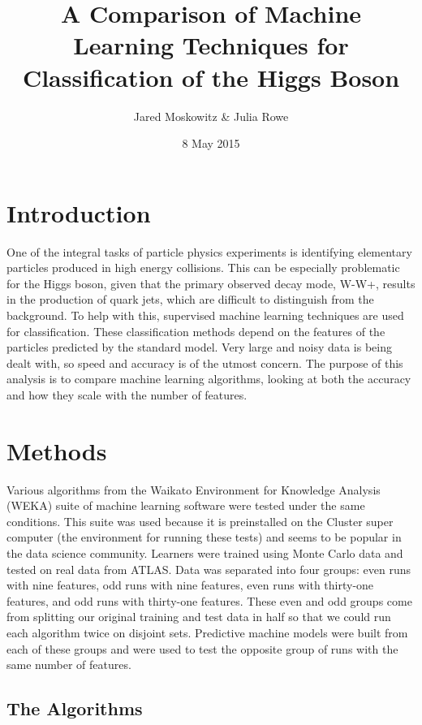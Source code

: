 \documentclass[aps, reprint, amsmath, amssymb]{revtex4-1}
\begin{document}
\title{A Comparison of Machine Learning Techniques for Classification of the Higgs Boson}
\author{Jared Moskowitz \& Julia Rowe}
\date{8 May 2015}

\maketitle

\section{Introduction}
One of the integral tasks of particle physics experiments is identifying elementary particles produced in high energy collisions. This can be especially problematic for the Higgs boson, given that the primary observed decay mode, W-W+, results in the production of quark jets, which are difficult to distinguish from the background. To help with this, supervised machine learning techniques are used for classification. These classification methods depend on the features of the particles predicted by the standard model.  Very large and noisy data is being dealt with, so speed and accuracy is of the utmost concern. The purpose of this analysis is to compare machine learning algorithms, looking at both the accuracy and how they scale with the number of features.  

\section{Methods}
Various algorithms from the Waikato Environment for Knowledge Analysis (WEKA) suite of machine learning software were tested under the same conditions. This suite was used because it is preinstalled on the Cluster super computer (the environment for running these tests) and seems to be popular in the data science community.  Learners were trained using Monte Carlo data and tested on real data from ATLAS.  Data was separated into four groups: even runs with nine features, odd runs with nine features, even runs with thirty-one features, and odd runs with thirty-one features.  These even and odd groups come from splitting our original training and test data in half so that we could run each algorithm twice on disjoint sets. Predictive machine models were built from each of these groups and were used to test the opposite group of runs with the same number of features.  

\subsection{The Algorithms}
\end{document}
